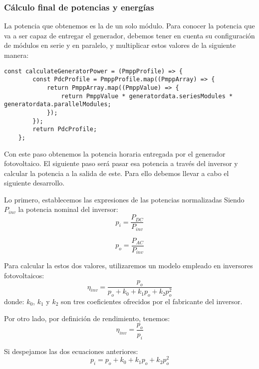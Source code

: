 \subsubsection{Cálculo final de potencias y energías}

La potencia que obtenemos es la de un solo módulo. Para conocer la potencia que va a ser capaz de entregar el generador, debemos tener en cuenta su configuración de módulos en serie y en paralelo, y multiplicar estos valores de la siguiente manera:

\begin{lstlisting}[style=ES6, caption={Cálculo de la potencia del generador}]
	const calculateGeneratorPower = (PmppProfile) => {
		const PdcProfile = PmppProfile.map((PmppArray) => {
			return PmppArray.map((PmppValue) => {
				return PmppValue * generatordata.seriesModules * generatordata.parallelModules;
			});
		});
		return PdcProfile;
	};

\end{lstlisting}

Con este paso obtenemos la potencia horaria entregada por el generador fotovoltaico. El siguiente paso será pasar esa potencia a través del inversor y calcular la potencia a la salida de este. Para ello debemos llevar a cabo el siguiente desarrollo.

Lo primero, establecemos las expresiones de las potencias normalizadas Siendo $P_{inv}$ la potencia nominal del inversor:
\begin{equation}
p_i = \frac{P_{DC}}{P_{inv}}
\end{equation}

\begin{equation}
\label{eqn_p_o}
p_o = \frac{P_{AC}}{P_{inv}}
\end{equation}

Para calcular la estos dos valores, utilizaremos un modelo empleado en inversores fotovoltaicos:
\begin{equation}
\eta_{inv} = \frac{p_o}{p_o + k_0 + k_1 p_o + k_2 p_o^2}
\end{equation}
donde: $k_0$, $k_1$ y $k_2$ son tres coeficientes ofrecidos por el fabricante del inversor.

Por otro lado, por definición de rendimiento, tenemos:
\begin{equation}
\eta_{inv} = \frac{p_o}{p_i}
\end{equation}

Si despejamos las dos ecuaciones anteriores:
\begin{equation}
p_i = p_o + k_0 + k_1p_o + k_2p_o^2
\end{equation}

